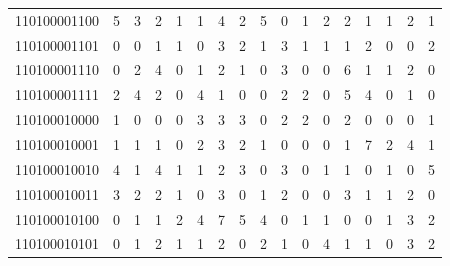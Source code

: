 \documentclass[10pt,a4paper]{article}
\begin{document}
\begin{longtable}{ |c|c|c|c|c|c|c|c|c|c|c|c|c|c|c|c|c| }
    110100001100              & 5                            & 3                                & 2                            & 1                              & 1   & 4   & 2   & 5   & 0   & 1   & 2   & 2   & 1   & 1   & 2   & 1   \\
    110100001101              & 0                            & 0                                & 1                            & 1                              & 0   & 3   & 2   & 1   & 3   & 1   & 1   & 1   & 2   & 0   & 0   & 2   \\
    110100001110              & 0                            & 2                                & 4                            & 0                              & 1   & 2   & 1   & 0   & 3   & 0   & 0   & 6   & 1   & 1   & 2   & 0   \\
    110100001111              & 2                            & 4                                & 2                            & 0                              & 4   & 1   & 0   & 0   & 2   & 2   & 0   & 5   & 4   & 0   & 1   & 0   \\
    110100010000              & 1                            & 0                                & 0                            & 0                              & 3   & 3   & 3   & 0   & 2   & 2   & 0   & 2   & 0   & 0   & 0   & 1   \\
    110100010001              & 1                            & 1                                & 1                            & 0                              & 2   & 3   & 2   & 1   & 0   & 0   & 0   & 1   & 7   & 2   & 4   & 1   \\
    110100010010              & 4                            & 1                                & 4                            & 1                              & 1   & 2   & 3   & 0   & 3   & 0   & 1   & 1   & 0   & 1   & 0   & 5   \\
    110100010011              & 3                            & 2                                & 2                            & 1                              & 0   & 3   & 0   & 1   & 2   & 0   & 0   & 3   & 1   & 1   & 2   & 0   \\
    110100010100              & 0                            & 1                                & 1                            & 2                              & 4   & 7   & 5   & 4   & 0   & 1   & 1   & 0   & 0   & 1   & 3   & 2   \\
    110100010101              & 0                            & 1                                & 2                            & 1                              & 1   & 2   & 0   & 2   & 1   & 0   & 4   & 1   & 1   & 0   & 3   & 2   \\

\end{longtable}
\end{document}
